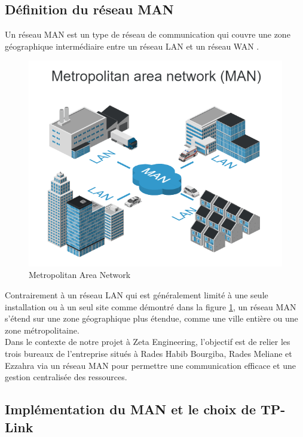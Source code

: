 \subsection{Définition du réseau MAN}

Un réseau MAN est un type de réseau de communication qui couvre une zone géographique intermédiaire entre un réseau LAN et un réseau WAN \cite{sze1985metropolitan}. \\


\begin{figure}[H]
 \centering
    \includegraphics[width=15cm]{Images/network-man1.png}
    \caption{Metropolitan Area Network}
    \label{Chap2.3.1}
\end{figure}  

Contrairement à un réseau LAN qui est généralement limité à une seule installation ou à un seul site comme démontré dans la figure \ref{Chap2.3.1}, un réseau MAN s'étend sur une zone géographique plus étendue, comme une ville entière ou une zone métropolitaine.  \\


Dans le contexte de notre projet à Zeta Engineering, l'objectif est de relier les trois bureaux de l'entreprise situés à Rades Habib Bourgiba, Rades Meliane et Ezzahra via un réseau MAN pour permettre une communication efficace et une gestion centralisée des ressources.  \\


\subsection{Implémentation du MAN et le choix de TP-Link}


